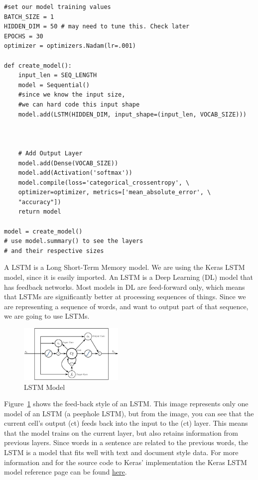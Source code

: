\documentclass{article}
\begin{document}
\begin{verbatim}
#set our model training values
BATCH_SIZE = 1
HIDDEN_DIM = 50 # may need to tune this. Check later
EPOCHS = 30
optimizer = optimizers.Nadam(lr=.001)

def create_model():
    input_len = SEQ_LENGTH
    model = Sequential()
    #since we know the input size, 
    #we can hard code this input shape
    model.add(LSTM(HIDDEN_DIM, input_shape=(input_len, VOCAB_SIZE)))



    # Add Output Layer
    model.add(Dense(VOCAB_SIZE))
    model.add(Activation('softmax'))
    model.compile(loss='categorical_crossentropy', \
    optimizer=optimizer, metrics=['mean_absolute_error', \ 
    "accuracy"])
    return model

model = create_model()
# use model.summary() to see the layers 
# and their respective sizes
\end{verbatim}

A LSTM is a Long Short-Term Memory model. We are using the Keras LSTM model, since it is easily imported. An LSTM is a Deep Learning (DL) model that has feedback networks. Most models in DL are feed-forward only, which means that LSTMs are significantly better at processing sequences of things. Since we are representing a sequence of words, and want to output part of that sequence, we are going to use LSTMs. 

\begin{figure}[h!]
\centering
\includegraphics[width=50mm]{LSTM_wikipedia.png}
\caption{LSTM Model}
\label{fig:lstm}
\end{figure}

Figure~\ref{fig:lstm} shows the feed-back style of an LSTM. This image represents only one model of an LSTM (a peephole LSTM), but from the image, you can see that the current cell's output (ct) feeds back into the input to the (ct) layer. This means that the model trains on the current layer, but also retains information from previous layers. Since words in a sentence are related to the previous words, the LSTM is a model that fits well with text and document style data. For more information and for the source code to Keras' implementation the Keras LSTM model reference page can be found \href{https://keras.io/api/layers/recurrent_layers/lstm/}{here}. 
\end{document}
